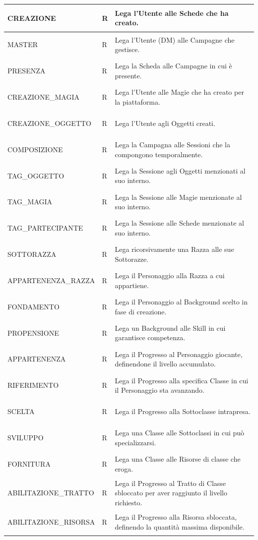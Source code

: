 \documentclass[a4paper,12pt]{report}
\begin{document}
\begin{longtable}{@{} >{\bfseries\raggedright\arraybackslash}p{} >{\centering\arraybackslash}p{} >{\raggedright\arraybackslash}p{} @{}}
    CREAZIONE & R & Lega l'Utente alle Schede che ha creato. \\ \midrule 
    MASTER & R & Lega l'Utente (DM) alle Campagne che gestisce. \\ \midrule 
    PRESENZA & R & Lega la Scheda alle Campagne in cui è presente. \\ \midrule 
    CREAZIONE\_MAGIA & R & Lega l'Utente alle Magie che ha creato per la piattaforma. \\ \midrule 
    CREAZIONE\_OGGETTO & R & Lega l'Utente agli Oggetti creati. \\ \midrule 
    COMPOSIZIONE & R & Lega la Campagna alle Sessioni che la compongono temporalmente. \\ \midrule 
    TAG\_OGGETTO & R & Lega la Sessione agli Oggetti menzionati al suo interno. \\ \midrule 
    TAG\_MAGIA & R & Lega la Sessione alle Magie menzionate al suo interno. \\ \midrule 
    TAG\_PARTECIPANTE & R & Lega la Sessione alle Schede menzionate al suo interno. \\ \midrule 
    SOTTORAZZA & R & Lega ricorsivamente una Razza alle sue Sottorazze. \\ \midrule 
    APPARTENENZA\_RAZZA & R & Lega il Personaggio alla Razza a cui appartiene. \\ \midrule 
    FONDAMENTO & R & Lega il Personaggio al Background scelto in fase di creazione. \\ \midrule
    PROPENSIONE & R & Lega un Background alle Skill in cui garantisce competenza. \\ \midrule
    APPARTENENZA & R & Lega il Progresso al Personaggio giocante, definendone il livello accumulato. \\ \midrule 
    RIFERIMENTO & R & Lega il Progresso alla specifica Classe in cui il Personaggio sta avanzando. \\ \midrule 
    SCELTA & R & Lega il Progresso alla Sottoclasse intrapresa. \\ \midrule 
    SVILUPPO & R & Lega una Classe alle Sottoclassi in cui può specializzarsi. \\ \midrule 
    FORNITURA & R & Lega una Classe alle Risorse di classe che eroga. \\ \midrule 
    ABILITAZIONE\_TRATTO & R & Lega il Progresso al Tratto di Classe sbloccato per aver raggiunto il livello richiesto. \\ \midrule 
    ABILITAZIONE\_RISORSA & R & Lega il Progresso alla Risorsa sbloccata, definendo la quantità massima disponibile. \\ \midrule 

\end{longtable}
\end{document}
